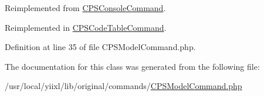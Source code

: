 Reimplemented from \hyperlink{classCPSConsoleCommand_af71005841ce53adac00581ab0ba24c1f}{CPSConsoleCommand}.



Reimplemented in \hyperlink{classCPSCodeTableCommand_af71005841ce53adac00581ab0ba24c1f}{CPSCodeTableCommand}.



Definition at line 35 of file CPSModelCommand.php.



The documentation for this class was generated from the following file:\begin{DoxyCompactItemize}
\item 
/usr/local/yiixl/lib/original/commands/\hyperlink{CPSModelCommand_8php}{CPSModelCommand.php}\end{DoxyCompactItemize}
